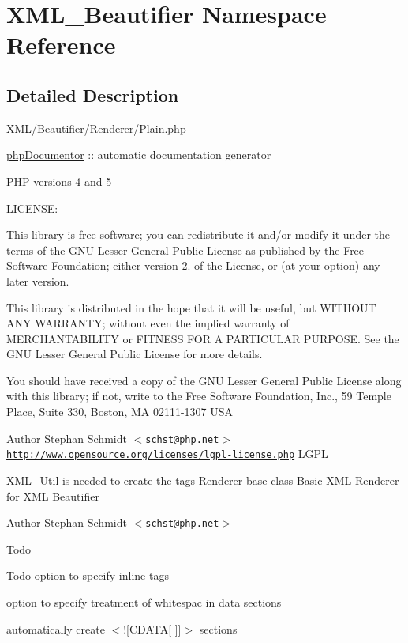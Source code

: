 \hypertarget{namespace_x_m_l___beautifier}{\section{\-X\-M\-L\-\_\-\-Beautifier \-Namespace \-Reference}
\label{namespace_x_m_l___beautifier}
}


\subsection{\-Detailed \-Description}
\-X\-M\-L/\-Beautifier/\-Renderer/\-Plain.\-php

\hyperlink{namespacephp_documentor}{php\-Documentor} \-:\-: automatic documentation generator

\-P\-H\-P versions 4 and 5

\-L\-I\-C\-E\-N\-S\-E\-:

\-This library is free software; you can redistribute it and/or modify it under the terms of the \-G\-N\-U \-Lesser \-General \-Public \-License as published by the \-Free \-Software \-Foundation; either version 2. of the \-License, or (at your option) any later version.

\-This library is distributed in the hope that it will be useful, but \-W\-I\-T\-H\-O\-U\-T \-A\-N\-Y \-W\-A\-R\-R\-A\-N\-T\-Y; without even the implied warranty of \-M\-E\-R\-C\-H\-A\-N\-T\-A\-B\-I\-L\-I\-T\-Y or \-F\-I\-T\-N\-E\-S\-S \-F\-O\-R \-A \-P\-A\-R\-T\-I\-C\-U\-L\-A\-R \-P\-U\-R\-P\-O\-S\-E. \-See the \-G\-N\-U \-Lesser \-General \-Public \-License for more details.

\-You should have received a copy of the \-G\-N\-U \-Lesser \-General \-Public \-License along with this library; if not, write to the \-Free \-Software \-Foundation, \-Inc., 59 \-Temple \-Place, \-Suite 330, \-Boston, \-M\-A 02111-\/1307 \-U\-S\-A

\begin{DoxyAuthor}{\-Author}
\-Stephan \-Schmidt $<$\href{mailto:schst@php.net}{\tt schst@php.\-net}$>$  \href{http://www.opensource.org/licenses/lgpl-license.php}{\tt http\-://www.\-opensource.\-org/licenses/lgpl-\/license.\-php} \-L\-G\-P\-L
\end{DoxyAuthor}
\-X\-M\-L\-\_\-\-Util is needed to create the tags \-Renderer base class \-Basic \-X\-M\-L \-Renderer for \-X\-M\-L \-Beautifier

\begin{DoxyAuthor}{\-Author}
\-Stephan \-Schmidt $<$\href{mailto:schst@php.net}{\tt schst@php.\-net}$>$ 
\end{DoxyAuthor}
\begin{DoxyRefDesc}{\-Todo}
\item[\hyperlink{todo__todo000018}{\-Todo}]option to specify inline tags 

option to specify treatment of whitespac in data sections 

automatically create $<$!\mbox{[}\-C\-D\-A\-T\-A\mbox{[} \mbox{]}\mbox{]}$>$ sections \end{DoxyRefDesc}
